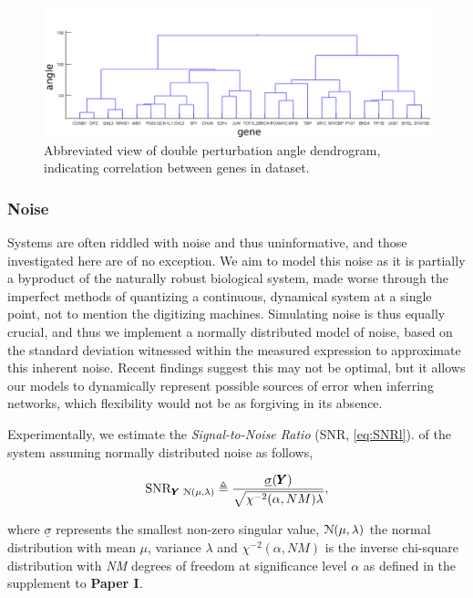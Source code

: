 \begin{figure}[H]
\centering
\includegraphics[width=1\linewidth]{4/MYC_Y_weightedDouble_dendrogram.png}
\caption{ Abbreviated view of double perturbation angle dendrogram, indicating correlation between genes in dataset. }
\label{fig:dend}
\end{figure}

\pagebreak

\subsubsection{Noise}
\label{sec:snr}
Systems are often riddled with noise and thus uninformative, and those investigated here are of no exception. We aim to model this noise as it is partially a byproduct of the naturally robust biological system, made worse through the imperfect methods of quantizing a continuous, dynamical system at a single point, not to mention the digitizing machines. Simulating noise is thus equally crucial, and thus we implement a normally distributed model of noise, based on the standard deviation witnessed within the measured expression to approximate this inherent noise. Recent findings suggest this may not be optimal, but it allows our models to dynamically represent possible sources of error when inferring networks, which flexibility would not be as forgiving in its absence.

Experimentally, we estimate the \emph{Signal-to-Noise Ratio} (SNR, \cref{eq:SNRl}). of the system assuming normally distributed noise as follows,

\begin{equation}
	\operatorname{SNR}_{{\pmb{Y}}\, \operatorname{\mathcal{N}(\mu,\lambda)}} \triangleq \frac{\underline{\sigma}({\pmb{Y}})}{\sqrt{\chi^{-2}(\alpha,NM)\lambda}},
  \label{eq:SNRl}
\end{equation}

where $\underline{\sigma}$ represents the smallest non-zero singular value, $\operatorname{\mathcal{N}(\mu,\lambda)}$ the normal distribution with mean $\mu$, variance $\lambda$ and $\chi^{-2}(\alpha,NM)$ is the inverse chi-square distribution with \emph{NM} degrees of freedom at significance level $\alpha$ as defined in the supplement to \textbf{Paper I}.

